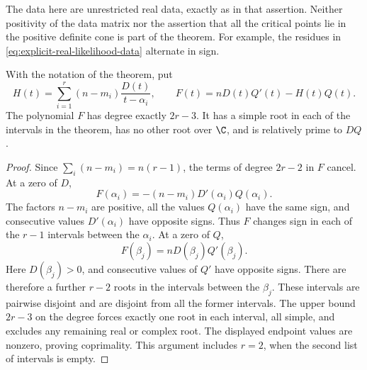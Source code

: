 The data here are unrestricted real data, exactly as in that
assertion.  Neither positivity of the data matrix nor the assertion
that all the critical points lie in the positive definite cone is
part of the theorem.  For example, the residues in
\eqref{eq:explicit-real-likelihood-data} alternate in sign.

\begin{lemma}
\label{lem:separated-root-score}
With the notation of the theorem, put
\begin{equation}\label{eq:weighted-score-polynomial}
 H(t)=\sum_{i=1}^r(n-m_i)\frac{D(t)}{t-\alpha_i},
 \qquad F(t)=nD(t)Q'(t)-H(t)Q(t).
\end{equation}
The polynomial \(F\) has degree exactly \(2r-3\).  It has a
simple root in each of the intervals in the theorem, has no other
root over \(\C\), and is relatively prime to \(DQ\).
\end{lemma}
\begin{proof}
Since \(\sum_i(n-m_i)=n(r-1)\), the terms of degree
\(2r-2\) in \(F\) cancel.  At a zero of \(D\),
\[
 F(\alpha_i)=-(n-m_i)D'(\alpha_i)Q(\alpha_i).
\]
The factors \(n-m_i\) are positive, all the values
\(Q(\alpha_i)\) have the same sign, and consecutive values
\(D'(\alpha_i)\) have opposite signs.  Thus \(F\) changes
sign in each of the \(r-1\) intervals between the \(\alpha_i\).
At a zero of \(Q\),
\[
                        F(\beta_j)=nD(\beta_j)Q'(\beta_j).
\]
Here \(D(\beta_j)>0\), and consecutive values of \(Q'\) have
opposite signs.  There are therefore a further \(r-2\) roots in
the intervals between the \(\beta_j\).  These intervals are
pairwise disjoint and are disjoint from all the former intervals.
The upper bound \(2r-3\) on the degree forces exactly one root
in each interval, all simple, and excludes any remaining real or
complex root.  The displayed endpoint values are nonzero, proving
coprimality.  This argument includes \(r=2\), when the second
list of intervals is empty.
\end{proof}

